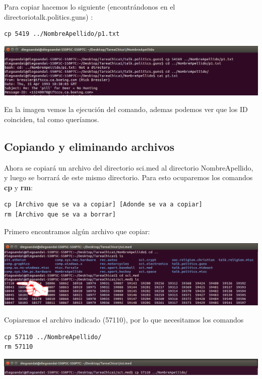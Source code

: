 \documentclass[a4paper,11pt]{article}
\theoremstyle{mytheor}
\begin{document}
Para copiar hacemos lo siguiente (encontrándonos en el directoriotalk.politics.guns) :

\begin{lstlisting}
cp 5419 ../NombreApellido/p1.txt
\end{lstlisting}

\begin{center}
\includegraphics[scale=0.4]{tc1_paso8Redo(2).png}
\end{center}

En la imagen vemos la ejecución del comando, ademas podemos ver que los ID coinciden, tal como queríamos.

\subsection{Copiando y eliminando archivos}

Ahora se copiará un archivo del directorio sci.med al directorio NombreApellido, y luego se borrará de este mismo directorio. Para esto ocuparemos los comandos \textbf{cp} y \textbf{rm}:

\begin{lstlisting}
cp [Archivo que se va a copiar] [Adonde se va a copiar]
rm [Archivo que se va a borrar]
\end{lstlisting}

Primero encontramos algún archivo que copiar:

\begin{center}
\includegraphics[scale=0.385]{tc1_14.png}
\end{center}

Copiaremos el archivo indicado (57110), por lo que necesitamos los comandos
\begin{lstlisting}
cp 57110 ../NombreApellido/
rm 57110
\end{lstlisting}

\begin{center}
\includegraphics[scale=0.385]{tc1_paso9(1).png}
\end{center}
\end{document}
